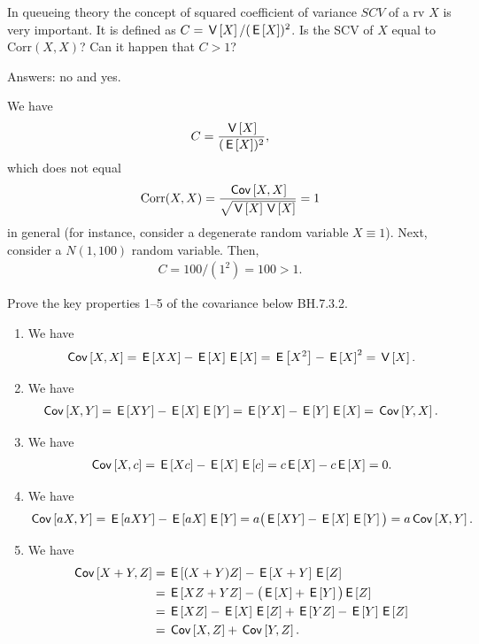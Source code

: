 \begin{exercise}
In queueing theory  the concept of squared coefficient of variance $SCV$ of a rv $X$ is very important. It is defined as $C = \V{X}/(\E X)^{2}$. Is the SCV of $X$ equal to $\text{Corr}(X,X)$? Can it happen that $C>1$?
\begin{solution}
Answers: no and yes.

We have
\begin{align}
    C = \frac{\V{X}}{(\E{X})^2},
\end{align}
which does not equal
\begin{align}
    \text{Corr}(X,X) = \frac{\cov{X,X}}{\sqrt{\V{X}\V{X}}} = 1
\end{align}
in general (for instance, consider a degenerate random variable $X \equiv 1$). Next, consider a $N(1,100)$ random variable. Then,
\begin{align}
    C = 100/(1^2) = 100 > 1.
\end{align}
\end{solution}
\end{exercise}


\begin{exercise}
Prove the key properties 1--5 of the covariance below BH.7.3.2.
\begin{solution}
\begin{enumerate}
    \item We have
    \begin{align}
        \cov{X,X} = \E{XX} - \E{X}\E{X} = \E{X^2} - \E{X}^2 = \V{X}.
    \end{align}
    \item We have
    \begin{align}
        \cov{X,Y} = \E{XY} - \E{X}\E{Y} = \E{YX} - \E{Y} \E{X} = \cov{Y, X}.
    \end{align}
    \item We have
    \begin{align}
        \cov{X,c} = \E{Xc} - \E{X}\E{c} = c\E{X} - c\E{X} = 0.
    \end{align}
    \item We have
    \begin{align}
        \cov{aX,Y} = \E{aXY} - \E{aX}\E{Y} = a\big(\E{XY} - \E{X}\E{Y}\big) = a\cov{X,Y}.
    \end{align}
    \item We have
    \begin{align}
        \cov{X+Y, Z} &= \E{(X + Y)Z} - \E{X+Y}\E{Z} \\
        &= \E{XZ + YZ} - \big(\E{X} + \E{Y}\big) \E{Z}\\
        &= \E{XZ} - \E{X}\E{Z} + \E{YZ} - \E{Y}\E{Z} \\
        &= \cov{X,Z} + \cov{Y,Z}.
    \end{align}
\end{enumerate}
\end{solution}
\end{exercise}

